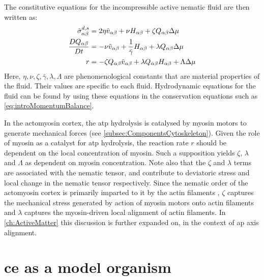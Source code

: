 The constitutive equations for the incompressible active nematic fluid are then written as:
\begin{subequations}\label{eq:constitutiveEqActiveNematic}
    \begin{align}
        \Tilde{\sigma}^{d,s}_{\alpha\beta} &= 2\eta \Tilde{v}_{\alpha\beta} + \nu H_{\alpha\beta} + \zeta Q_{\alpha\beta}\Delta\mu\\
        \frac{DQ_{\alpha\beta}}{Dt} &= -\nu \Tilde{v}_{\alpha\beta} + \frac{1}{\bar{\gamma}} H_{\alpha\beta} + \lambda Q_{\alpha\beta}\Delta\mu\\
        r &= -\zeta Q_{\alpha\beta}\Tilde{v}_{\alpha\beta} + \lambda Q_{\alpha\beta}H_{\alpha\beta} + \Lambda\Delta\mu
    \end{align}
\end{subequations}
Here, $\eta,\nu,\zeta,\bar{\gamma},\lambda,\Lambda$ are phenomenological constants that are material properties of the fluid. Their values are specific to each fluid. Hydrodynamic equations for the fluid can be found by using these equations in the conservation equations such as \autoref{eq:introMomentumBalance}.

In the actomyosin cortex, the \ac{atp} hydrolysis is catalysed by myosin motors to generate mechanical forces (see \autoref{subsec:ComponentsCytoskeleton}). Given the role of myosin as a catalyst for \ac{atp} hydrolysis, the reaction rate $r$ should be dependent on the local concentration of myosin. Such a supposition yields $\zeta$, $\lambda$ and $\Lambda$ as dependent on myosin concentration. Note also that the $\zeta$ and $\lambda$ terms are associated with the nematic tensor, and contribute to deviatoric stress and local change in the nematic tensor respectively. Since the nematic order of the actomyosin cortex is primarily imparted to it by the actin filaments \citep{reymann2016cortical}, $\zeta$ captures the mechanical stress generated by action of myosin motors onto actin filaments and $\lambda$ captures the myosin-driven local alignment of actin filaments. In \autoref{ch:ActiveMatter} this discussion is further expanded on, in the context of \ac{ap} axis alignment.

\section{\acs{ce} as a model organism}\label{sec:CelegansModel}

